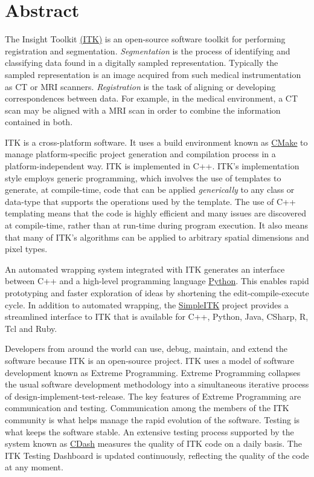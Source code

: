 \chapter*{Abstract}
\noindent
The Insight Toolkit \href{http://itk.org}{(ITK)} is an open-source
software toolkit for performing registration and
segmentation. \emph{Segmentation} is the process of identifying and
classifying data found in a digitally sampled
representation. Typically the sampled representation is an image
acquired from such medical instrumentation as CT or MRI
scanners. \emph{Registration} is the task of aligning or developing
correspondences between data. For example, in the medical environment,
a CT scan may be aligned with a MRI scan in order to combine the
information contained in both.

ITK is a cross-platform software. It uses a build environment known as
\href{http://cmake.org}{CMake} to manage platform-specific project
generation and compilation process in a platform-independent way. ITK is
implemented in C++. ITK's implementation style employs generic programming,
which involves the use of templates to generate, at compile-time, code that can
be applied \emph{generically} to any class or data-type that supports the
operations used by the template. The use of C++ templating means that the code
is highly efficient and many issues are discovered at compile-time, rather than
at run-time during program execution. It also means that many of ITK's
algorithms can be applied to arbitrary spatial dimensions and pixel types.

An automated wrapping system integrated with ITK generates an interface between
C++ and a high-level programming language \href{http://www.python.org}{Python}.
This enables rapid prototyping and faster exploration of ideas by shortening the
edit-compile-execute cycle. In addition to automated
wrapping, the \href{http://www.itk.org/Wiki/SimpleITK}{SimpleITK} project
provides a streamlined interface to ITK that is available for C++, Python, Java,
CSharp, R, Tcl and Ruby.

Developers from around the world can use, debug, maintain, and extend the
software because ITK is an open-source project. ITK uses a
model of software development known as Extreme
Programming. Extreme Programming collapses the usual software development
methodology into a simultaneous iterative process of
design-implement-test-release. The key features of Extreme Programming
are communication and testing. Communication among the members of the
ITK community is what helps manage the rapid evolution of the
software. Testing is what keeps the software stable. An
extensive testing process supported by the system known as
\href{http://open.cdash.org/index.php?project=Insight}{CDash}
measures the quality of ITK code on a daily basis. The ITK Testing Dashboard is
updated continuously, reflecting the quality of the code at any moment.

